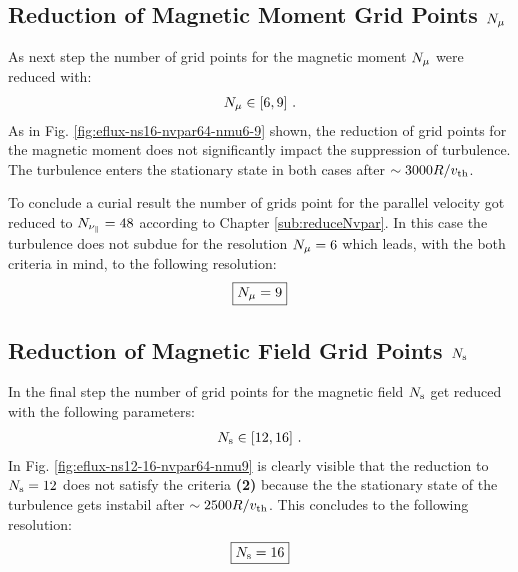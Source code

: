 \subsection{Reduction of Magnetic Moment Grid Points $N_\mu$}
\label{sub:reduceNmu}

As next step the number of grid points for the magnetic moment $N_\mu$ were reduced with:
\begin{gather*}
	N_\mu \in [6, 9] ~.
\end{gather*}
As in Fig. \ref{fig:eflux-ns16-nvpar64-nmu6-9} shown, the reduction of grid points for the magnetic moment does not significantly impact the suppression of turbulence. The turbulence enters the stationary state in both cases after $\sim 3000 R/v_{\mathrm{th}}$.  


To conclude a curial result the number of grids point for the parallel velocity got reduced to $N_{\nu_\parallel} = 48$ according to Chapter \ref{sub:reduceNvpar}. In this case the turbulence does not subdue for the resolution $N_\mu = 6$ which leads, with the both criteria in mind, to the following resolution:
\begin{gather*}
	\boxed{N_\mu = 9}
\end{gather*}


\subsection{Reduction of Magnetic Field Grid Points $N_\mathrm{s}$}
\label{sub:reduceNs}

In the final step the number of grid points for the magnetic field $N_\mathrm{s}$ get reduced with the following parameters:
\begin{gather*}
	N_\mathrm{s} \in [12, 16]~.
\end{gather*}
In Fig. \ref{fig:eflux-ns12-16-nvpar64-nmu9} is clearly visible that the reduction to $N_\mathrm{s} = 12$ does not satisfy the criteria \textbf{(2)} because the the stationary state of the turbulence gets instabil after $\sim 2500 R/v_{\mathrm{th}}$. This concludes to the following resolution:
\begin{gather*}
	\boxed{N_\mathrm{s} = 16}
\end{gather*}

